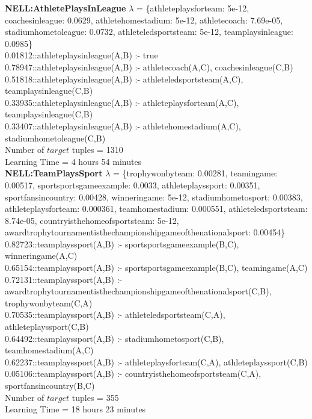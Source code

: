 \documentclass[akbc,twoside,11pt]{article}
\newcounter{example}
\begin{document}
\begin{tiny}
\noindent \textbf{NELL:AthletePlaysInLeague} $\lambda$ = \{athleteplaysforteam: 5e-12, coachesinleague: 0.0629, athletehomestadium: 5e-12, athletecoach: 7.69e-05, stadiumhometoleague: 0.0732, athleteledsportsteam: 5e-12, teamplaysinleague: 0.0985\} \\
0.01812::athleteplaysinleague(A,B) :- true \\
0.78947::athleteplaysinleague(A,B) :- athletecoach(A,C), coachesinleague(C,B) \\
0.51818::athleteplaysinleague(A,B) :- athleteledsportsteam(A,C), teamplaysinleague(C,B) \\
0.33935::athleteplaysinleague(A,B) :- athleteplaysforteam(A,C), teamplaysinleague(C,B) \\
0.33407::athleteplaysinleague(A,B) :- athletehomestadium(A,C), stadiumhometoleague(C,B) \\
Number of $target$ tuples = 1310 \\
Learning Time = 4 hours 54 minutes \\ %

\noindent \textbf{NELL:TeamPlaysSport} $\lambda$ = \{trophywonbyteam: 0.00281, teamingame: 0.00517, sportsportsgameexample: 0.0033, athleteplayssport: 0.00351, sportfansincountry: 0.00428, winneringame: 5e-12, stadiumhometosport: 0.00383, athleteplaysforteam: 0.000361, teamhomestadium: 0.000551, athleteledsportsteam: 8.74e-05, countryisthehomeofsportsteam: 5e-12, awardtrophytournamentisthechampionshipgameofthenationalsport: 0.00454\} \\
0.82723::teamplayssport(A,B) :- sportsportsgameexample(B,C), winneringame(A,C) \\
0.65154::teamplayssport(A,B) :- sportsportsgameexample(B,C), teamingame(A,C) \\
0.72131::teamplayssport(A,B) :- awardtrophytournamentisthechampionshipgameofthenationalsport(C,B), trophywonbyteam(C,A) \\
0.70535::teamplayssport(A,B) :- athleteledsportsteam(C,A), athleteplayssport(C,B) \\
0.64492::teamplayssport(A,B) :- stadiumhometosport(C,B), teamhomestadium(A,C) \\
0.62237::teamplayssport(A,B) :- athleteplaysforteam(C,A), athleteplayssport(C,B) \\
0.05106::teamplayssport(A,B) :- countryisthehomeofsportsteam(C,A), sportfansincountry(B,C) \\
Number of $target$ tuples = 355 \\
Learning Time = 18 hours 23 minutes \\ %


\end{tiny}
\end{document}
